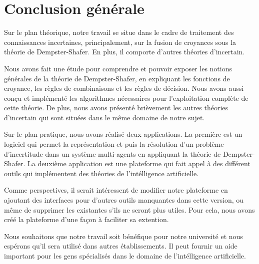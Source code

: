 {}
\chapter*{Conclusion générale}

Sur le plan théorique, notre travail se situe dans le cadre de traitement des connaissances incertaines,
principalement, sur la fusion de croyances sous la théorie de Dempster-Shafer. En plus, il comporte d'autres
théories d'incertain.

Nous avons fait une étude pour comprendre et pouvoir exposer les notions générales de la théorie de Dempster-Shafer,
en expliquant les fonctions de croyance, les règles de combinaisons et les règles de décision. 
Nous avons aussi conçu et implémenté les algorithmes nécessaires pour l'exploitation complète de cette théorie. De plus,
nous avons présenté brièvement les autres théories d'incertain qui sont situées dans le même domaine de notre sujet.

Sur le plan pratique, nous avons réalisé deux applications. La première est un logiciel qui permet la représentation
et puis la résolution d'un problème d'incertitude dans un système multi-agents en appliquant la théorie de Dempster-Shafer.
La deuxième application est une plateforme qui fait appel à des différent outils qui implémentent des théories de
l'intélligence artificielle.

Comme perspectives, il serait intéressent de modifier notre plateforme en ajoutant des interfaces pour d'autres outils
manquantes dans cette version, ou même de supprimer les existantes s'ils ne seront plus utiles. Pour cela, nous avons créé
la plateforme d'une façon à faciliter sa extention.

Nous souhaitons que notre travail soit bénéfique pour notre université et nous espérons qu'il sera utilisé dans autres
établissements. Il peut fournir un aide important pour les gens spécialisés dans le domaine de l'intélligence artificielle.